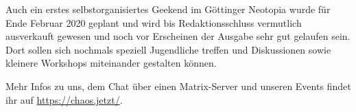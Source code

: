 \begin{DSarticle}[
    title={chaos.jetzt},
    author=ruru4143, email=ruru-cj-ds@r3.at,
    head=chaos.jetzt,
    tocentry=chaos.jetzt,
]
Auch ein erstes selbstorganisiertes Geekend im Göttinger Neotopia wurde für Ende Februar 2020 geplant und wird bis Redaktionsschluss vermutlich ausverkauft gewesen und noch vor Erscheinen der Ausgabe sehr gut gelaufen sein.
Dort sollen sich nochmals speziell Jugendliche treffen und Diskussionen sowie kleinere Workshops miteinander gestalten können.

Mehr Infos zu uns, dem Chat über einen Matrix-Server und unseren Events findet ihr auf \url{https://chaos.jetzt/}.





\end{DSarticle}
